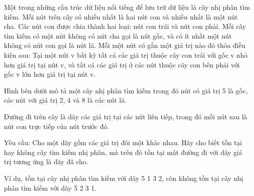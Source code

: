 Một trong những cấu trúc dữ liệu nổi tiếng để lưu trữ dữ liệu là cây nhị phân tìm kiếm. Mỗi nút trên cây có nhiều nhất là hai nút con và nhiều nhất là một nút cha. Các nút con được chia thành hai loại: nút con trái và nút con phải. Mỗi cây tìm kiếm có một nút không có nút cha gọi là nút gốc, và có ít nhất một nút không có nút con gọi là nút lá. Mỗi một nút có gắn một giá trị nào đó thỏa điều kiện sau: Tại một nút v bất kỳ tất cả các giá trị thuộc cây con trái với gốc v nhỏ hơn giá trị tại nút v, và tất cả các giá trị ở các nút thuộc cây con bên phải với gốc v lớn hơn giá trị tại nút v.  

   Hình bên dưới mô tả một cây nhị phân tìm kiếm trong đó nút có giá trị 5 là gốc, các nút với giá trị 2, 4 và 8 là các nút lá.  

   Đường đi trên cây là dãy các giá trị tại các nút liên tiếp, trong đó mỗi nút sau là nút con trực tiếp của nút trước đó.  

   Yêu cầu: Cho một dãy gồm các giá trị đôi một khác nhau. Hãy cho biết tồn tại hay không cây tìm kiếm nhị phân, mà trên đó tồn tại một đường đi với dãy giá trị tương ứng là dãy đã cho.  

   Ví dụ, tồn tại cây nhị phân tìm kiếm với dãy 5 1 3 2, còn không tồn tại cây nhị phân tìm kiếm với dãy 5 2 3 1.  

\